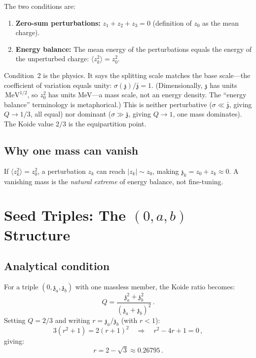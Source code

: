 \documentclass[12pt,a4paper]{article}
\newcommand{\MeV}{\,\text{MeV}}
\newcommand{\zch}{\mathfrak{z}}
\begin{document}
The two conditions are:
\begin{enumerate}
\item \textbf{Zero-sum perturbations:} $z_1 + z_2 + z_3 = 0$ 
(definition of $z_0$ as the mean charge).
\item \textbf{Energy balance:} The mean energy of the perturbations 
equals the energy of the unperturbed charge: 
$\langle z_k^2\rangle = z_0^2$.
\end{enumerate}

Condition~2 is the physics. It says the splitting scale matches the
base scale---the coefficient of variation equals unity:
$\sigma(\zch)/\bar{\zch} = 1$.
(Dimensionally, $\zch$ has units $\MeV^{1/2}$, so
$z_0^2$ has units MeV---a mass scale, not an energy density.
The ``energy balance'' terminology is metaphorical.) This is neither perturbative 
($\sigma \ll \bar{\zch}$, giving $Q \to 1/3$, all equal) nor 
dominant ($\sigma \gg \bar{\zch}$, giving $Q \to 1$, one mass 
dominates). The Koide value $2/3$ is the equipartition point.

\subsection{Why one mass can vanish}

If $\langle z_k^2\rangle = z_0^2$, a perturbation $z_k$ can reach 
$|z_k| \sim z_0$, making $\zch_k = z_0 + z_k \approx 0$. A vanishing 
mass is the \emph{natural extreme} of energy balance, not fine-tuning.

\section{Seed Triples: The $(0, a, b)$ Structure}
\label{sec:seeds}

\subsection{Analytical condition}

For a triple $(0, \zch_a, \zch_b)$ with one massless member, the 
Koide ratio becomes:
\begin{equation}
Q = \frac{\zch_a^2 + \zch_b^2}{(\zch_a + \zch_b)^2}\,.
\end{equation}
Setting $Q = 2/3$ and writing $r = \zch_a/\zch_b$ (with $r < 1$):
\begin{equation}
3(r^2 + 1) = 2(r + 1)^2 \quad\Longrightarrow\quad r^2 - 4r + 1 = 0\,,
\end{equation}
giving:
\begin{equation}
\boxed{r = 2 - \sqrt{3} \approx 0.26795\,.}
\end{equation}
\end{document}
